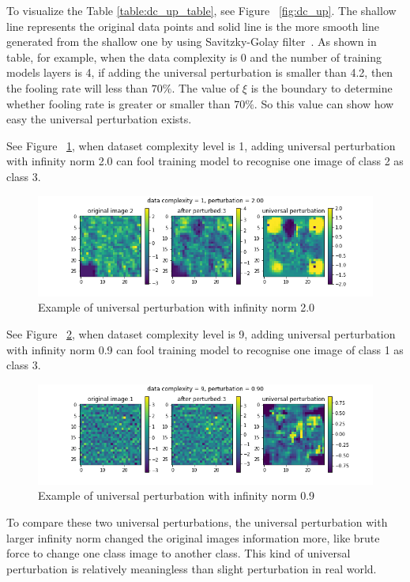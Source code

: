 \documentclass{article}
\begin{document}
To visualize the Table \ref{table:dc_up_table}, see Figure~ \ref{fig:dc_up}. The shallow line represents the original data points and solid line is the more smooth line generated from the shallow one by using Savitzky-Golay filter~\cite{LUO20051429}. As shown in table, for example, when the data complexity is 0 and the number of training models layers is 4, if adding the universal perturbation is smaller than 4.2, then the fooling rate will less than $70\%$. The value of $\xi$ is the boundary to determine whether fooling rate is greater or smaller than $70\%$. So this value can show how easy the universal perturbation exists.

See Figure~ \ref{fig:per2}, when dataset complexity level is 1, adding universal perturbation with infinity norm 2.0 can fool training model to recognise one image of class 2 as class 3.
\begin{figure}[h]
    \centering
    \includegraphics[width=1\linewidth]{model-c1-l4-pb-per2.png}
    \caption{\small Example of universal perturbation with infinity norm 2.0}
    \label{fig:per2}
\end{figure}

See Figure~ \ref{fig:per09}, when dataset complexity level is 9, adding universal perturbation with infinity norm 0.9 can fool training model to recognise one image of class 1 as class 3.
\begin{figure}[h]
    \centering
    \includegraphics[width=1\linewidth]{model-c9-l4-pb-per09.png}
    \caption{\small Example of universal perturbation with infinity norm 0.9}
    \label{fig:per09}
\end{figure}

To compare these two universal perturbations, the universal perturbation with larger infinity norm changed the original images information more, like brute force  to change one class image to another class. This kind of universal perturbation is relatively meaningless than slight perturbation in real world.
\end{document}
